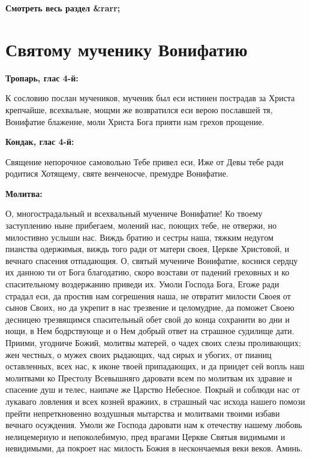 \mychapterending


\bfseries Смотреть весь раздел &rarr;\normalfont{} 

\section{Святому мученику Вонифатию}
 


\bfseries Тропарь, глас 4-й:\normalfont{}


К сословию послан мучеников, мученик был еси истинен пострадав за Христа крепчайше, всехвальне, мощми же возвратился еси верою пославшей тя, Вонифатие блаженне, моли Христа Бога прияти нам грехов прощение.


\medskip


\bfseries Кондак, глас 4-й:\normalfont{}


Священие непорочное самовольно Тебе привел еси, Иже от Девы тебе ради родитися Хотящему, святе венченосче, премудре Вонифатие.


\medskip


\bfseries Молитва:\normalfont{}


О, многострадальный и всехвальный мучениче Вонифатие! Ко твоему заступлению ныне прибегаем, молений нас, поющих тебе, не отвержи, но милостивно услыши нас. Виждь братию и сестры наша, тяжким недугом пианства одержимыя, виждь того ради от матери своея, Церкве Христовой, и вечнаго спасения отпадающия. О, святый мучениче Вонифатие, коснися сердцу их данною ти от Бога благодатию, скоро возстави от падений греховных и ко спасительному воздержанию приведи их. Умоли Господа Бога, Егоже ради страдал еси, да простив нам согрешения наша, не отвратит милости Своея от сынов Своих, но да укрепит в нас трезвение и целомудрие, да поможет Своею десницею трезвящимся спасительный обет свой до конца сохранити во дни и нощи, в Нем бодрствующе и о Нем добрый ответ на страшное судилище дати. Приими, угодниче Божий, молитвы матерей, о чадех своих слезы проливающих; жен честных, о мужех своих рыдающих, чад сирых и убогих, от пианиц оставленных, всех нас, к иконе твоей припадающих, и да приидет сей вопль наш молитвами ко Престолу Всевышняго даровати всем по молитвам их здравие и спасение душ и телес, наипаче же Царство Небесное. Покрый и соблюди нас от лукаваго ловления и всех козней вражиих, в страшный час исхода нашего помози прейти непреткновенно воздушныя мытарства и молитвами твоими избави вечнаго осуждения. Умоли же Господа даровати нам к отечеству нашему любовь нелицемерную и непоколебимую, пред врагами Церкве Святыя видимыми и невидимыми, да покроет нас милость Божия в нескончаемыя веки веков. Аминь.


